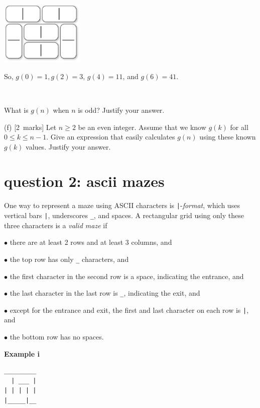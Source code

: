 \documentclass[12pt]{article}
\newcommand{\mymarks}[1]{\mbox{\small [#1 marks]}}
\begin{document}
\vspace{-5mm}
\begin{center}
\includegraphics[width=40mm]{Figures/34-tiling.eps}
\end{center}
\vspace{-5mm}
\noindent
So, $g(0) = 1, g(2) = 3$, $g(4) = 11$, and $g(6) = 41$.

~

\noindent
What is $g(n)$ when $n$ is odd? Justify your answer.

\vfill

\noindent
(f) \mymarks{2}
Let $n \geq 2$ be an even integer. 
Assume that we know $g(k)$ for all $0 \leq k \leq n-1$. 
Give an expression that easily calculates $g(n)$
using these known $g(k)$ values. Justify your answer.


\vfill
\vfill


\newpage
\section*{question 2: ascii mazes}

One way to represent a maze using ASCII characters is
\texttt{|}-{\em format}, which uses 
vertical bars \verb&|&, underscores \verb&_&, and spaces.
A rectangular grid using only these three 
characters is a {\em valid maze} if

$\bullet$ there are at least 2 rows and at least 3 columns, and

$\bullet$ the top row has only \verb&_& characters, and

$\bullet$ the first character in the second row 
is a space, indicating the entrance, and

$\bullet$ the last character in the last row is \verb&_&,
indicating the exit, and

$\bullet$ except for the entrance and exit,
the first and last character on each row is \verb&|&,  and

$\bullet$
the bottom row has no spaces.
\vfill

\noindent
\begin{minipage}[c]{3cm}
{\bf Example i}
\end{minipage}
\begin{minipage}[c]{10cm}
\begin{verbatim}
_________
  | ___ |
| | | | |
|_____|__

\end{verbatim}
\end{minipage}
\end{document}
